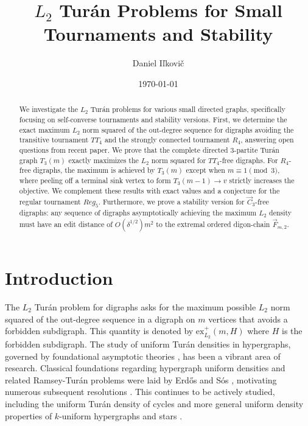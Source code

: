 \documentclass[a4paper]{amsart}
\title{$L_2$ Tur\'an Problems for Small Tournaments and Stability}
\author{Daniel I\v{l}kovi\v{c}}
\date{\today}
\begin{document}
\maketitle

\begin{abstract}
We investigate the $L_2$ Tur\'an problems for various small directed graphs, specifically focusing on self-converse tournaments and stability versions.
First, we determine the exact maximum $L_2$ norm squared of the out-degree sequence for digraphs avoiding the transitive tournament $TT_4$ and the strongly connected tournament $R_4$, answering open questions from recent paper.
We prove that the complete directed 3-partite Tur\'an graph $T_3(m)$ exactly maximizes the $L_2$ norm squared for $TT_4$-free digraphs.
For $R_4$-free digraphs, the maximum is achieved by $T_3(m)$ except when $m \equiv 1 \pmod 3$, where peeling off a terminal sink vertex to form $T_3(m-1) \to v$ strictly increases the objective.
We complement these results with exact values and a conjecture for the regular tournament $Reg_5$.
Furthermore, we prove a stability version for $\vec{C}_3$-free digraphs: any sequence of digraphs asymptotically achieving the maximum $L_2$ density must have an edit distance of $O(\delta^{1/2})m^2$ to the extremal ordered digon-chain $\vec{F}_{m,2}$.
\end{abstract}

\section{Introduction}

The $L_2$ Tur\'an problem for digraphs asks for the maximum possible $L_2$ norm squared of the out-degree sequence in a digraph on $m$ vertices that avoids a forbidden subdigraph.
This quantity is denoted by $\text{ex}^+_{L_2}(m, H)$ where $H$ is the forbidden subdigraph.
The study of uniform Tur\'an densities in hypergraphs, governed by foundational asymptotic theories \cite{erdos1946structure, erdos1966limit}, has been a vibrant area of research. Classical foundations regarding hypergraph uniform densities and related Ramsey-Tur\'an problems were laid by Erd\H{o}s and S\'os \cite{erdos1982ramsey}, motivating numerous subsequent resolutions \cite{glebov2016problem, reiher2018turan}. This continues to be actively studied, including the uniform Tur\'an density of cycles \cite{bucic2023uniform} and more general uniform density properties of $k$-uniform hypergraphs and stars \cite{lin2026uniform, lin2025turan, king2025possible}.
\end{document}
